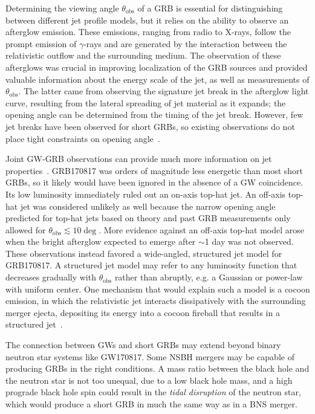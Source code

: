 Determining the viewing angle $\theta_{\mathrm{obs}}$ of a \ac{GRB} is essential for distinguishing between different jet profile models, but it relies on the ability to observe an afterglow emission.
These emissions, ranging from radio to X-rays, follow the prompt emission of $\gamma$-rays and are generated by the interaction between the relativistic outflow and the surrounding medium.
The observation of these afterglows was crucial in improving localization of the \ac{GRB} sources and provided valuable information about the energy scale of the jet, as well as measurements of $\theta_{\mathrm{obs}}$.
The latter came from observing the signature jet break in the afterglow light curve, resulting from the lateral spreading of jet material as it expands; the opening angle can be determined from the timing of the jet break.
However, few jet breaks have been observed for short \acp{GRB}, so existing observations do not place tight constraints on opening angle~\citep{Biscoveanu_2020}.

Joint GW-GRB observations can provide much more information on jet properties~\citep{Mogushi_2019, Farah_2020}.
GRB170817 was orders of magnitude less energetic than most short \acp{GRB}, so it likely would have been ignored in the absence of a \ac{GW} coincidence.
Its low luminosity immediately ruled out an on-axis top-hat jet.
An off-axis top-hat jet was considered unlikely as well because the narrow opening angle predicted for top-hat jets based on theory and past \ac{GRB} measurements only allowed for $\theta_{\mathrm{obs}} \lesssim 10\deg$.
More evidence against an off-axis top-hat model arose when the bright afterglow expected to emerge after $\sim$1 day was not observed.
These observations instead favored a wide-angled, structured jet model for GRB170817.
A structured jet model may refer to any luminosity function that decreases gradually with $\theta_{\mathrm{obs}}$ rather than abruptly, e.g. a Gaussian or power-law with uniform center.
One mechanism that would explain such a model is a cocoon emission, in which the relativistic jet interacts dissipatively with the surrounding merger ejecta, depositing its energy into a cocoon fireball that results in a structured jet~\citep{gw170817_grb}.

The connection between GWs and short GRBs may extend beyond binary neutron star systems like GW170817.
Some \ac{NSBH} mergers may be capable of producing GRBs in the right conditions.
A mass ratio between the black hole and the neutron star is not too unequal, due to a low black hole mass, and a high prograde black hole spin could result in the \textit{tidal disruption} of the neutron star, which would produce a short GRB in much the same way as in a \ac{BNS} merger.


